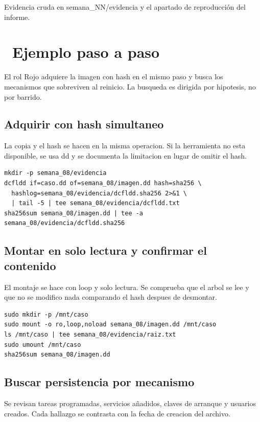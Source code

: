 \documentclass[11pt,a4paper]{article}
\newcommand{\iconotexto}[2]{\textcolor{cyanNeon}{\faIcon{#1}}~#2}
\begin{document}
Evidencia cruda en semana\_NN/evidencia y el apartado de reproducción del informe.

\section{\iconotexto{list-ol}{Ejemplo paso a paso}}

El rol Rojo adquiere la imagen con hash en el mismo paso y busca los mecanismos que sobreviven al reinicio. La busqueda es dirigida por hipotesis, no por barrido.

\subsection{Adquirir con hash simultaneo}

La copia y el hash se hacen en la misma operacion. Si la herramienta no esta disponible, se usa dd y se documenta la limitacion en lugar de omitir el hash.

\begin{lstlisting}[style=estiloCodigo]
mkdir -p semana_08/evidencia
dcfldd if=caso.dd of=semana_08/imagen.dd hash=sha256 \
  hashlog=semana_08/evidencia/dcfldd.sha256 2>&1 \
  | tail -5 | tee semana_08/evidencia/dcfldd.txt
sha256sum semana_08/imagen.dd | tee -a semana_08/evidencia/dcfldd.sha256
\end{lstlisting}

\subsection{Montar en solo lectura y confirmar el contenido}

El montaje se hace con loop y solo lectura. Se comprueba que el arbol se lee y que no se modifico nada comparando el hash despues de desmontar.

\begin{lstlisting}[style=estiloCodigo]
sudo mkdir -p /mnt/caso
sudo mount -o ro,loop,noload semana_08/imagen.dd /mnt/caso
ls /mnt/caso | tee semana_08/evidencia/raiz.txt
sudo umount /mnt/caso
sha256sum semana_08/imagen.dd
\end{lstlisting}

\subsection{Buscar persistencia por mecanismo}

Se revisan tareas programadas, servicios añadidos, claves de arranque y usuarios creados. Cada hallazgo se contrasta con la fecha de creacion del archivo.
\end{document}
